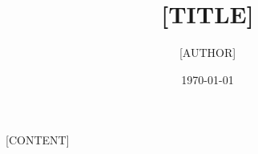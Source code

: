 \documentclass[12pt]{article}
\title{[TITLE]}
\author{[AUTHOR]}
\date{\today}
\begin{document}
\maketitle

\tableofcontents
\clearpage

[CONTENT]
\end{document}
